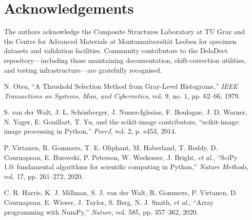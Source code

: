 \documentclass[preprint,12pt,a4paper]{elsarticle}
\begin{document}
\section*{Acknowledgements}
The authors acknowledge the Composite Structures Laboratory at TU Graz and the Centre for Advanced
Materials at Montanuniversit\"{a}t Leoben for specimen datasets and validation facilities. Community
contributors to the DelaDect repository---including those maintaining documentation, shift-correction
utilities, and testing infrastructure---are gratefully recognised.

\begin{thebibliography}{00}

N. Otsu, ``A Threshold Selection Method from Gray-Level Histograms,'' \textit{IEEE Transactions on
Systems, Man, and Cybernetics}, vol. 9, no. 1, pp. 62--66, 1979.

S. van der Walt, J. L. Sch\"{o}nberger, J. Nunez-Iglesias, F. Boulogne, J. D. Warner, N. Yager,
E. Gouillart, T. Yu, and the scikit-image contributors, ``scikit-image: image processing in Python,''
\textit{PeerJ}, vol. 2, p. e453, 2014.

P. Virtanen, R. Gommers, T. E. Oliphant, M. Haberland, T. Reddy, D. Cournapeau, E. Burovski,
P. Peterson, W. Weckesser, J. Bright, \textit{et al.}, ``SciPy 1.0: fundamental algorithms for
scientific computing in Python,'' \textit{Nature Methods}, vol. 17, pp. 261--272, 2020.

C. R. Harris, K. J. Millman, S. J. van der Walt, R. Gommers, P. Virtanen, D. Cournapeau,
E. Wieser, J. Taylor, S. Berg, N. J. Smith, \textit{et al.}, ``Array programming with NumPy,''
\textit{Nature}, vol. 585, pp. 357--362, 2020.

\end{thebibliography}
\end{document}
